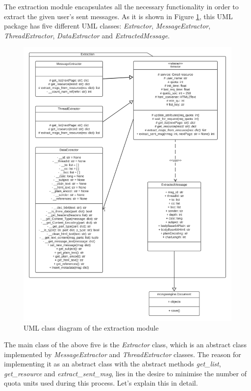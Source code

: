 The extraction module encapsulates all the necessary functionality in order to extract the given user's sent messages. As it is shown in Figure \ref{fig:umlext}, this UML package has five different UML classes: \textit{Extractor}, \textit{MessageExtractor}, \textit{ThreadExtractor}, \textit{DataExtractor} and \textit{ExtractedMessage}.

\begin{figure}[p]
	\centering%
	\centerline{\includegraphics[width=0.9\paperwidth]{Imagenes/Bitmap/Analyser/extractionUML.png}}%
	\caption{UML class diagram of the extraction module}%
	\label{fig:umlext}
\end{figure}


The main class of the above five is the \textit{Extractor} class, which is an abstract class implemented by \textit{MessageExtractor} and \textit{ThreadExtractor} classes. The reason for implementing it as an abstract class with the abstract methods \textit{get\_list}, \textit{get\_resource} and \textit{extract\_sent\_msg}, lies in the desire to minimise the number of quota units used during this process. Let's explain this in detail.

